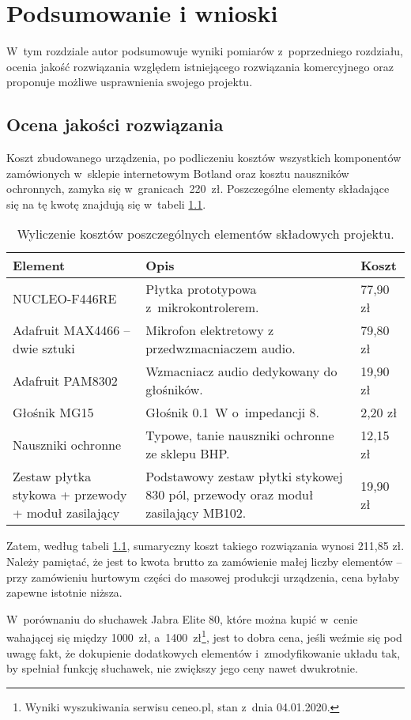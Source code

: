 \chapter{Podsumowanie i wnioski}
\label{cha:wnioski}
W~tym rozdziale autor podsumowuje wyniki pomiarów z~poprzedniego rozdziału, ocenia jakość rozwiązania względem istniejącego rozwiązania komercyjnego oraz proponuje możliwe usprawnienia swojego projektu.
\section{Ocena jakości rozwiązania}
Koszt zbudowanego urządzenia, po podliczeniu kosztów wszystkich komponentów zamówionych w~sklepie internetowym Botland oraz kosztu nauszników ochronnych, zamyka się w~granicach~220~zł. Poszczególne elementy składające się na tę kwotę znajdują się w~tabeli \ref{tab:costs}.
\begin{table}[h!]
	\centering
	\caption{Wyliczenie kosztów poszczególnych elementów składowych projektu.}
	\label{tab:costs}
		\begin{tabular}{|p{} | p{} | p{}|}
		\hline 
		Element & Opis & Koszt \\ 
		\hline\hline
		NUCLEO-F446RE & Płytka prototypowa z~mikrokontrolerem. & 77,90 zł \\ 
		\hline
		Adafruit MAX4466 -- dwie sztuki & Mikrofon elektretowy z przedwzmacniaczem audio. & 79,80 zł \\
		\hline
		Adafruit PAM8302 & Wzmacniacz audio dedykowany do głośników. & 19,90 zł \\
		\hline
		Głośnik MG15 & Głośnik \SI{0,1}{\W} o~impedancji \SI{8}{\Omega}. & 2,20 zł \\
		\hline
		Nauszniki ochronne & Typowe, tanie nauszniki ochronne ze sklepu BHP. & 12,15 zł \\
		\hline
		Zestaw płytka stykowa + przewody + moduł zasilający & Podstawowy zestaw płytki stykowej 830 pól, przewody oraz moduł zasilający MB102. & 19,90 zł \\
		\hline
	\end{tabular}
\end{table}

Zatem, według tabeli \ref{tab:costs}, sumaryczny koszt takiego rozwiązania wynosi 211,85 zł. Należy pamiętać, że jest to kwota brutto za zamówienie małej liczby elementów -- przy zamówieniu hurtowym części do masowej produkcji urządzenia, cena byłaby zapewne istotnie niższa.

W~porównaniu do słuchawek Jabra Elite 80, które można kupić w~cenie wahającej się między 1000~zł, a~1400~zł\footnote{Wyniki wyszukiwania serwisu ceneo.pl, stan z~dnia 04.01.2020.}, jest to dobra cena, jeśli weźmie się pod uwagę fakt, że dokupienie dodatkowych elementów i~zmodyfikowanie układu tak, by spełniał funkcję słuchawek, nie zwiększy jego ceny nawet dwukrotnie.

